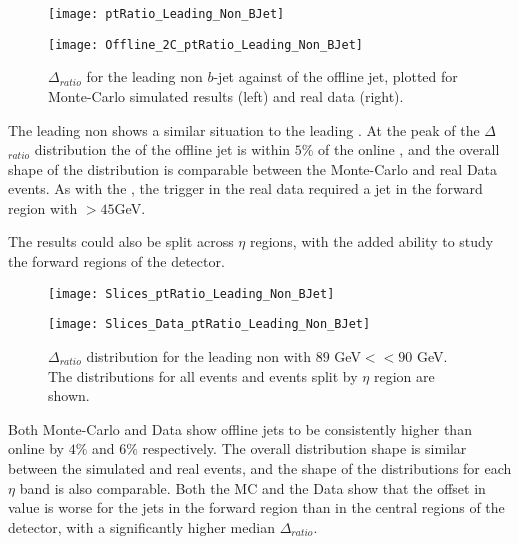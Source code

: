 	\begin{figure}[h]
		\centering
		\begin{minipage}[h]{0.33\linewidth}
			\texttt{[image: ptRatio\_Leading\_Non\_BJet]}
			
		\end{minipage}
		\quad
		\begin{minipage}[h]{0.33\linewidth}
			\texttt{[image: Offline\_2C\_ptRatio\_Leading\_Non\_BJet]}
		\end{minipage}
		\caption{$\Delta $\pt$_{ratio}$ for the leading \pt non $b$-jet against \pt of the offline jet, plotted for Monte-Carlo simulated results (left) and real data (right).}
		\label{fig:O:leadingnonbpt}
	\end{figure}
	
	The leading non \bjet shows a similar situation to the leading \bjet. At the peak of the $\Delta $\pt$_{ratio}$ distribution the \pt of the offline jet is within $5\%$ of the online \pt, and the overall shape of the distribution is comparable between the Monte-Carlo and real Data events. As with the \bjets, the trigger in the real data required a jet in the forward region with \pt$>45$GeV. 
	
	The results could also be split across $\eta$ regions, with the added ability to study the forward regions of the detector. 
	
	\begin{figure}[h]
		\centering
		
		\begin{minipage}[h]{0.33\linewidth}
			\texttt{[image: Slices\_ptRatio\_Leading\_Non\_BJet]}
		\end{minipage}
		\quad
		\begin{minipage}[h]{0.33\linewidth}
			\texttt{[image: Slices\_Data\_ptRatio\_Leading\_Non\_BJet]}
		\end{minipage}
		\caption{$\Delta $\pt$_{ratio}$ distribution for the leading non \bjet with $89$ GeV$<$\pt$<90$ GeV. The distributions for all events and events split by $\eta$ region are shown.}
		\label{fig:O:leadingnonbptslice}
	\end{figure}
	
	Both Monte-Carlo and Data show offline jets to be consistently higher \pt than online by $4\%$ and $6\%$ respectively. The overall distribution shape is similar between the simulated and real events, and the shape of the distributions for each $\eta$ band is also comparable. Both the MC and the Data show that the offset in \pt value is worse for the jets in the forward region than in the central regions of the detector, with a significantly higher median $\Delta $\pt$_{ratio}$. 
	
